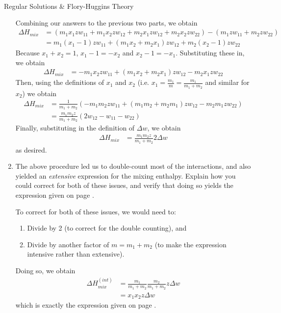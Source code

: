\begin{activity}{Regular Solutions \& Flory-Huggins Theory}
\begin{exercises}
\begin{enumerate}
		\begin{solution}{}
		
			Combining our answers to the previous two parts, we obtain
			\begin{align*}
				\Delta H_{mix} &= (m_1 x_1 z w_{11} + m_1 x_2 z w_{12} + m_2 x_1 z w_{12} + m_2 x_2 z w_{22}) - (m_1 z w_{11} + m_2 z w_{22})\\
				&= m_1(x_1-1)zw_{11} + (m_1 x_2 + m_2 x_1)z w_{12} + m_2 (x_2-1) z w_{22}
			\end{align*}
			Because $x_1+x_2 = 1$, $x_1-1 = -x_2$ and $x_2-1=-x_1$.  Substituting these in, we obtain
			\begin{align*}
				\Delta H_{mix} &= -m_1 x_2 zw_{11} + (m_1 x_2 + m_2 x_1)z w_{12} - m_2 x_1 z w_{22}
			\end{align*}
			Then, using the definitions of $x_1$ and $x_2$ (i.e. $x_1 = \frac{m_1}{m} = \frac{m_1}{m_1+m_2}$ and similar for $x_2$) we obtain
			\begin{align*}
				\Delta H_{mix} &= \frac{1}{m_1+m_2}\left(-m_1 m_2 z w_{11} + (m_1 m_2 + m_2 m_1) z w_{12} - m_2 m_1 z w_{22}\right)\\
				&=\frac{m_1 m_2 z}{m_1+m_2}( 2 w_{12} - w_{11} - w_{22})
			\end{align*}
			Finally, substituting in the definition of $\Delta w$, we obtain
			\begin{align*}
				\Delta H_{mix} &= \frac{m_1 m_2 z}{m_1+m_2} 2\Delta w
			\end{align*}
			as desired.
		
		\end{solution}
		
	\item The above procedure led us to double-count most of the interactions, and also yielded an \emph{extensive} expression for the mixing enthalpy.  Explain how you could correct for both of these issues, and verify that doing so yields the expression given on page \pageref{\labelbase:eqn:Hmix}.
	
		\begin{solution}{}
		
			To correct for both of these issues, we would need to:
			\begin{enumerate}
				\item Divide by 2 (to correct for the double counting), and 
				\item Divide by another factor of $m=m_1+m_2$ (to make the expression intensive rather than extensive).
			\end{enumerate}
			Doing so, we obtain
			\begin{align*}
				\Delta H_{mix}^{(int)} &= \frac{m_1}{m_1+m_2}\frac{m_2}{m_1+m_2}z\Delta w \\
				&= x_1 x_2 z \Delta w
			\end{align*}
			which is exactly the expression given on page \pageref{\labelbase:eqn:Hmix}.
		

\end{solution}
\end{enumerate}
\end{exercises}
\end{activity}

